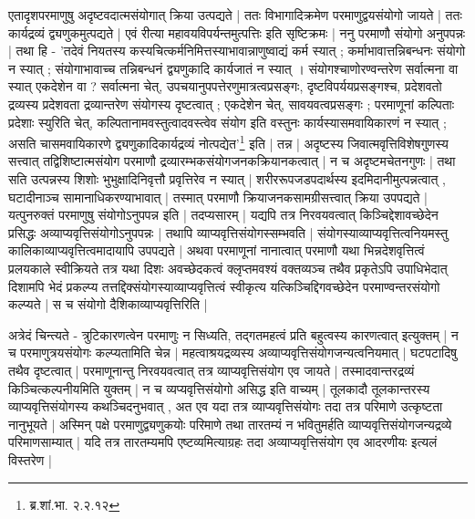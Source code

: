 एतादृशपरमाणुषु अदृष्टवदात्मसंयोगात् क्रिया उत्पद्यते | ततः विभागादिक्रमेण परमाणुद्वयसंयोगो जायते | ततः कार्यद्रव्यं द्व्यणुकमुत्पद्यते | एवं रीत्या महावयविपर्यन्तमुत्पत्तिः इति सृष्टिक्रमः | ननु परमाणौ संयोगो अनुपपन्नः | तथा हि - {\fontsize{11.7}{0}\selectfont\s 'तदेवं नियतस्य कस्यचित्कर्मनिमित्तस्याभावान्नाणुष्वाद्यं कर्म स्यात् ; कर्माभावात्तन्निबन्धनः संयोगो न स्यात् ; संयोगाभावाच्च तन्निबन्धनं द्व्यणुकादि कार्यजातं न स्यात् । संयोगश्चाणोरण्वन्तरेण सर्वात्मना वा स्यात् एकदेशेन वा ? सर्वात्मना चेत्, उपचयानुपपत्तेरणुमात्रत्वप्रसङ्गः, दृष्टविपर्ययप्रसङ्गश्च, प्रदेशवतो द्रव्यस्य प्रदेशवता द्रव्यान्तरेण संयोगस्य दृष्टत्वात् ; एकदेशेन चेत्, सावयवत्वप्रसङ्गः ; परमाणूनां कल्पिताः प्रदेशाः स्युरिति चेत्, कल्पितानामवस्तुत्वादवस्त्वेव संयोग इति वस्तुनः कार्यस्यासमवायिकारणं न स्यात् ; असति चासमवायिकारणे द्व्यणुकादिकार्यद्रव्यं नोत्पद्येत'\footnote{ब्र.शां.भा. २.२.१२}} इति | तन्न | अदृष्टस्य जिवात्मवृत्तिविशेषगुणस्य सत्त्वात् तद्विशिष्टात्मसंयोग परमाणौ द्रव्यारम्भकसंयोगजनकक्रियानकत्वात् |‌ न च अदृष्टमचेतनगुणः | तथा सति उत्पन्नस्य शिशोः भुभुक्षादिनिवृत्तौ प्रवृत्तिरेव न स्यात् | शरीररूपजडपदार्थस्य इदमिदानीमुत्पन्नत्वात् , घटादीनाञ्च सामानाधिकरण्याभावात् | तस्मात् परमाणौ क्रियाजनकसामग्रीसत्त्वात् क्रिया उपपद्यते | यत्पुनरुक्तं परमाणुषु संयोगोऽनुपपन्न इति | तदप्यसारम् | यद्यपि तत्र निरवयवत्वात् किञ्चिद्देशावच्छेदेन प्रसिद्धः अव्याप्यवृत्तिसंयोगोऽनुपपन्नः | तथापि व्याप्यवृत्तिसंयोगस्सम्भवति | संयोगस्याव्याप्यवृत्तित्वनियमस्तु कालिकाव्याप्यवृत्तित्वमादायापि उपपद्यते | अथवा परमाणूनां नानात्वात् परमाणौ यथा भिन्नदेशवृत्तित्वं प्रलयकाले स्वीक्रियते तत्र यथा दिशः अवच्छेदकत्वं क्लृप्तमवश्यं वक्तव्यञ्च तथैव प्रकृतेऽपि उपाधिभेदात् दिशामपि भेदं प्रकल्प्य तत्तद्दिक्संयोगस्याव्याप्यवृत्तित्वं स्वीकृत्य यत्किञ्चिद्दिगवच्छेदेन परमाण्वन्तरसंयोगो कल्प्यते | स च संयोगो दैशिकाव्याप्यवृत्तिरिति |

अत्रेदं चिन्त्यते -  त्रुटिकारणत्वेन परमाणुः न सिध्यति, तद्गतमहत्वं प्रति बहुत्वस्य कारणत्वात् इत्युक्तम् | न च परमाणुत्रयसंयोगः कल्प्यतामिति चेन्न | महत्वाश्रयद्रव्यस्य अव्याप्यवृत्तिसंयोगजन्यत्वनियमात् | घटपटादिषु तथैव दृष्टत्वात् | परमाणूनान्तु निरवयवत्वात् तत्र व्याप्यवृत्तिसंयोग एव जायते | तस्मादवान्तरद्रव्यं किञ्चित्कल्पनीयमिति युक्तम् | न च व्यप्यवृत्तिसंयोगो असिद्ध इति वाच्यम् | तूलकादौ तूलकान्तरस्य व्याप्यवृत्तिसंयोगस्य कथञ्चिदनुभवात् , अत एव यदा तत्र व्याप्यवृत्तिसंयोगः तदा तत्र परिमाणे उत्कृष्टता नानुभूयते | अस्मिन् पक्षे परमाणुद्व्यणुकयोः परिमाणे तथा तारतम्यं न भवितुमर्हति व्याप्यवृत्तिसंयोगजन्यद्रव्ये परिमाणसाम्यात् | यदि तत्र तारतम्यमपि एष्टव्यमित्याग्रहः तदा अव्याप्यवृत्तिसंयोग एव आदरणीयः इत्यलं विस्तरेण |

